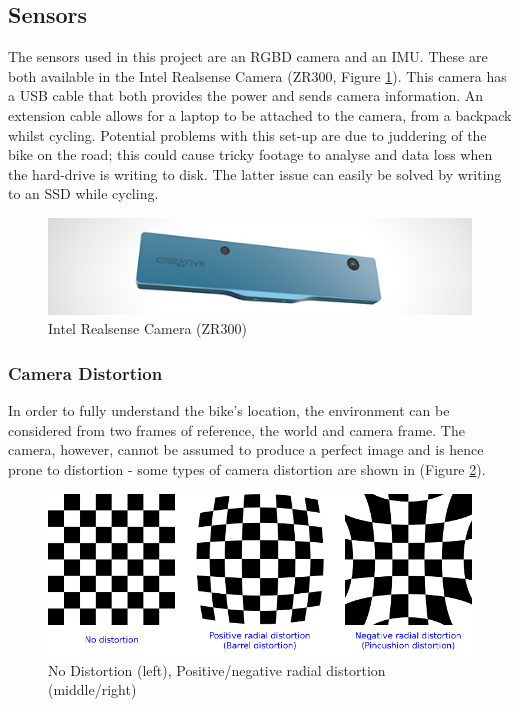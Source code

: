 \documentclass[11pt,twoside]{report}
\begin{document}
\subsection{Sensors}
The sensors used in this project are an RGBD camera and an IMU. These are both available in the Intel Realsense Camera (ZR300, Figure \ref{realsense_camera}). This camera has a USB cable that both provides the power and sends camera information. An extension cable allows for a laptop to be attached to the camera, from a backpack whilst cycling. Potential problems with this set-up are due to juddering of the bike on the road; this could cause tricky footage to analyse and data loss when the hard-drive is writing to disk. The latter issue can easily be solved by writing to an SSD while cycling.

\noindent \begin{figure}[h!]
	\includegraphics[width = 1.0\hsize]{./figures/intel_realsense.jpg}
	\caption{Intel Realsense Camera (ZR300)}
	\label{realsense_camera}
\end{figure}

\subsubsection{Camera Distortion}
In order to fully understand the bike's location, the environment can be considered from two frames of reference, the world and camera frame. The camera, however, cannot be assumed to produce a perfect image and is hence prone to distortion - some types of camera distortion are shown in (Figure \ref{distortion}).


\noindent \begin{figure}[h!]
	\includegraphics[width = 1\hsize]{figures/distortion_example.png} 
	\caption{No Distortion (left)\cite{opencv_camera_article}, Positive/negative radial distortion (middle/right)}
	\label{distortion}
\end{figure}
\end{document}
